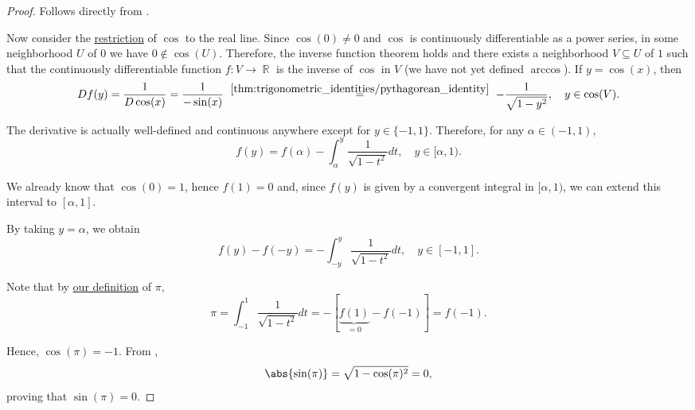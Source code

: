 \begin{proof}
   Follows directly from .

   Now consider the \hyperref[def:multi_valued_function/restriction]{restriction} of \( \cos \) to the real line. Since \( \cos(0) \neq 0 \) and \( \cos \) is continuously differentiable as a power series, in some neighborhood \( U \) of \( 0 \) we have \( 0 \not\in \cos(U) \). Therefore, the inverse function theorem holds and there exists a neighborhood \( V \subseteq U \) of \( 1 \) such that the continuously differentiable function \( f: V \to \BbbR \) is the inverse of \( \cos \) in \( V \) (we have not yet defined \hyperref[def:inverse_trigonometric_functions/arccos]{\( \arccos \)}). If \( y = \cos(x) \), then
  \begin{equation*}
    Df(y)
    =
    \frac 1 {D\cos(x)}
    =
    \frac 1 {-\sin(x)}
    \reloset {\ref{thm:trigonometric_identities/pythagorean_identity}} =
    -\frac 1 {\sqrt{1 - y^2}},
    \quad y \in \cos(V).
  \end{equation*}

  The derivative is actually well-defined and continuous anywhere except for \( y \in \{ -1, 1 \} \). Therefore, for any \( \alpha \in (-1, 1) \),
  \begin{equation*}
    f(y) = f(\alpha) - \int_{\alpha}^y \frac 1 {\sqrt{1 - t^2}} dt, \quad y \in [\alpha, 1).
  \end{equation*}

  We already know that \( \cos(0) = 1 \), hence \( f(1) = 0 \) and, since \( f(y) \) is given by a convergent integral in \( [\alpha, 1) \), we can extend this interval to \( [\alpha, 1] \).

  By taking \( y = \alpha \), we obtain
  \begin{equation*}
    f(y) - f(-y) = -\int_{-y}^y \frac 1 {\sqrt{1 - t^2}} dt, \quad y \in [-1, 1].
  \end{equation*}

  Note that by \hyperref[def:pi]{our definition} of \( \pi \),
  \begin{equation*}
    \pi
    =
    \int_{-1}^1 \frac 1 {\sqrt{1 - t^2}} dt
    =
    -[\underbrace{f(1)}_{=0} - f(-1)]
    =
    f(-1).
  \end{equation*}

  Hence, \( \cos(\pi) = -1 \). From ,
  \begin{equation*}
    \abs{\sin(\pi)} = \sqrt{1 - \cos(\pi)^2} = 0,
  \end{equation*}
  proving that \( \sin(\pi) = 0 \).


\end{proof}

